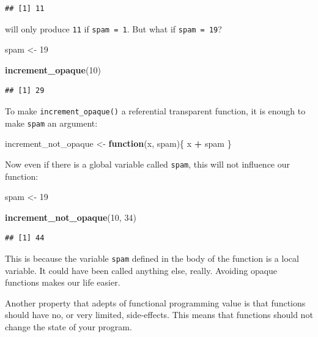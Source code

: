 \documentclass[]{gitbook}
\newenvironment{Shaded}{\begin{snugshade}}{\end{snugshade}}
\newcommand{\ControlFlowTok}[1]{\textcolor[rgb]{0.13,0.29,0.53}{\textbf{#1}}}
\newcommand{\DecValTok}[1]{\textcolor[rgb]{0.00,0.00,0.81}{#1}}
\newcommand{\KeywordTok}[1]{\textcolor[rgb]{0.13,0.29,0.53}{\textbf{#1}}}
\newcommand{\NormalTok}[1]{#1}
\newcommand{\OperatorTok}[1]{\textcolor[rgb]{0.81,0.36,0.00}{\textbf{#1}}}
\newcommand{\StringTok}[1]{\textcolor[rgb]{0.31,0.60,0.02}{#1}}
\begin{document}
\begin{verbatim}
## [1] 11
\end{verbatim}

will only produce \texttt{11} if \texttt{spam\ =\ 1}. But what if \texttt{spam\ =\ 19}?

\begin{Shaded}
\begin{Highlighting}[]
\NormalTok{spam <-}\StringTok{ }\DecValTok{19}

\KeywordTok{increment_opaque}\NormalTok{(}\DecValTok{10}\NormalTok{)}
\end{Highlighting}
\end{Shaded}

\begin{verbatim}
## [1] 29
\end{verbatim}

To make \texttt{increment\_opaque()} a referential transparent function, it is enough to make \texttt{spam} an
argument:

\begin{Shaded}
\begin{Highlighting}[]
\NormalTok{increment_not_opaque <-}\StringTok{ }\ControlFlowTok{function}\NormalTok{(x, spam)\{}
\NormalTok{    x }\OperatorTok{+}\StringTok{ }\NormalTok{spam}
\NormalTok{\}}
\end{Highlighting}
\end{Shaded}

Now even if there is a global variable called \texttt{spam}, this will not influence our function:

\begin{Shaded}
\begin{Highlighting}[]
\NormalTok{spam <-}\StringTok{ }\DecValTok{19}

\KeywordTok{increment_not_opaque}\NormalTok{(}\DecValTok{10}\NormalTok{, }\DecValTok{34}\NormalTok{)}
\end{Highlighting}
\end{Shaded}

\begin{verbatim}
## [1] 44
\end{verbatim}

This is because the variable \texttt{spam} defined in the body of the function is a local variable. It
could have been called anything else, really. Avoiding opaque functions makes our life easier.

Another property that adepts of functional programming value is that functions should have no, or
very limited, side-effects. This means that functions should not change the state of your program.
\end{document}
